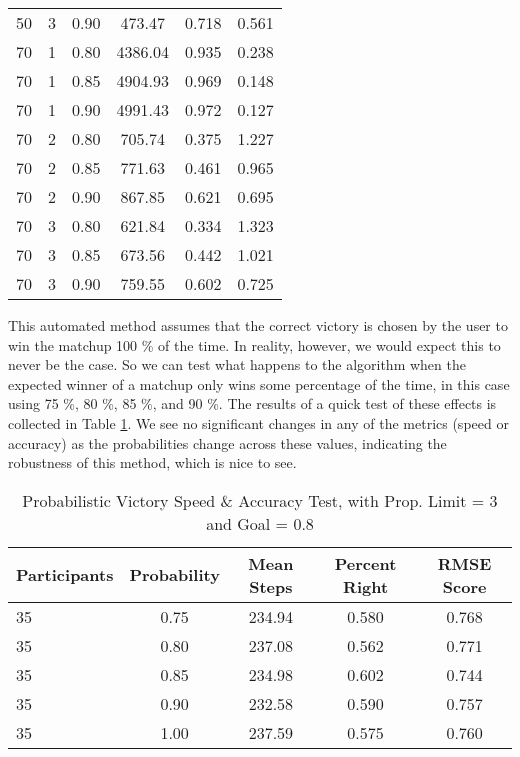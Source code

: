 \documentclass[11pt]{article}
\begin{document}
\begin{table}[H]
\begin{tabular}{lccccc}
50 & 3 & 0.90 & 473.47 & 0.718 & 0.561 \\
70 & 1 & 0.80 & 4386.04 & 0.935 & 0.238 \\
70 & 1 & 0.85 & 4904.93 & 0.969 & 0.148 \\
70 & 1 & 0.90 & 4991.43 & 0.972 & 0.127 \\
70 & 2 & 0.80 & 705.74 & 0.375 & 1.227 \\
70 & 2 & 0.85 & 771.63 & 0.461 & 0.965 \\
70 & 2 & 0.90 & 867.85 & 0.621 & 0.695 \\
70 & 3 & 0.80 & 621.84 & 0.334 & 1.323 \\
70 & 3 & 0.85 & 673.56 & 0.442 & 1.021 \\
70 & 3 & 0.90 & 759.55 & 0.602 & 0.725 \\
\bottomrule
\end{tabular}
\end{table}

\noindent This automated method assumes that the correct victory is chosen by the user to win the matchup 100 \% of the time. In reality, however, we would expect this to never be the case. So we can test what happens to the algorithm when the expected winner of a matchup only wins some percentage of the time, in this case using 75 \%, 80 \%, 85 \%, and 90 \%. The results of a quick test of these effects is collected in Table \ref{prob}. We see no significant changes in any of the metrics (speed or accuracy) as the probabilities change across these values, indicating the robustness of this method, which is nice to see. 

\begin{table}[H]
\caption{Probabilistic Victory Speed \& Accuracy Test, with Prop. Limit = 3 and Goal = 0.8 }
\label{prob}
\vspace{3mm}
\centering
\begin{tabular}{lcccc}
\toprule
\multicolumn{1}{l}{Participants}  & \multicolumn{1}{c}{Probability} & \multicolumn{1}{c}{Mean Steps} & \multicolumn{1}{c}{Percent Right} & \multicolumn{1}{c}{RMSE Score} \\
\midrule
35 & 0.75 & 234.94 & 0.580 & 0.768 \\
35 & 0.80 & 237.08 & 0.562 & 0.771 \\
35 & 0.85 & 234.98 & 0.602 & 0.744 \\
35 & 0.90 & 232.58 & 0.590 & 0.757 \\
35 & 1.00 & 237.59 & 0.575 & 0.760 \\
\bottomrule
\end{tabular}
\end{table}
\end{document}
